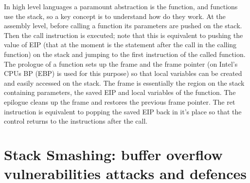 \documentclass[Lau,binding=0.6cm]{sapthesis}
\begin{document}
In high level languages a paramount abstraction is the function, and functions use the stack, so a key concept is to understand how do they work. At the assembly level, before calling a function its parameters are pushed on the stack. Then the call instruction is executed; note that this is equivalent to pushing the value of EIP (that at the moment is the statement after the call in the calling function) on the stack and jumping to the first instruction of the called function. The prologue of a function sets up the frame and the frame pointer (on Intel’s CPUs BP (EBP) is used for this purpose) so that local variables can be created and easily accessed on the stack. The frame is essentially the region on the stack containing parameters, the saved EIP and local variables of the function. The epilogue cleans up the frame and restores the previous frame pointer. The ret instruction is equivalent to popping the saved EIP back in it’s place so that the control returns to the instructions after the call.




\section{Stack Smashing: buffer overflow vulnerabilities attacks and defences}
\end{document}

